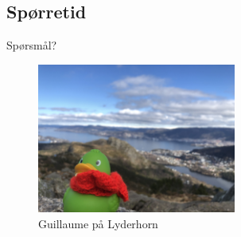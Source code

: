 \subsection*{Spørretid}
\begin{frame}{Spørsmål?}
    \begin{figure}
        \centering
        \includegraphics[height = 4.9cm]{images/guillaume8.jpg}
        \caption{Guillaume på Lyderhorn}
        \label{fig:guillaume8}
    \end{figure}
\end{frame}
